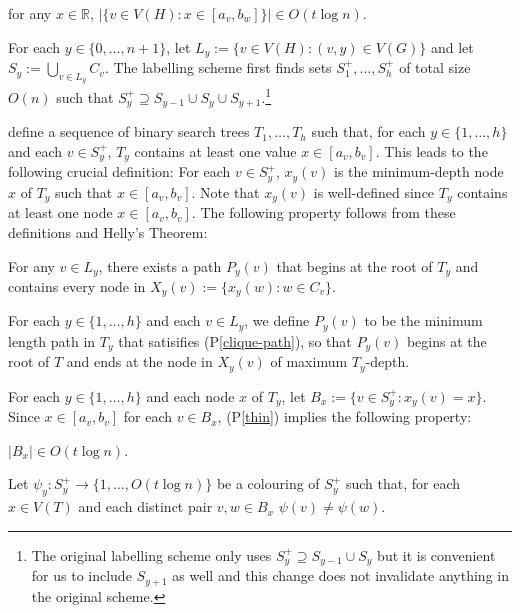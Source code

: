 \documentclass{patmorin}
\newcommand{\pref}[1]{(P\ref{#1})}
\newcommand{\R}{\mathbb{R}}
\begin{document}
\begin{compactenum}[(P1)]
    \item for any $x\in \R$, $|\{v\in V(H): x\in[a_v,b_w]\}|\in O(t\log n)$.\label{thin}
\end{compactenum}

For each $y\in\{0,\ldots,n+1\}$, let $L_y:=\{v\in V(H): (v,y)\in V(G)\}$ and let $S_y:=\bigcup_{v\in L_y}C_v$.  The labelling scheme first finds sets $S^+_1,\ldots,S^+_h$ of total size $O(n)$ such that $S^+_y\supseteq S_{y-1}\cup S_y\cup S_{y+1}$.\footnote{The original labelling scheme only uses $S^+_y\supseteq S_{y-1}\cup S_y$ but it is convenient for us to include $S_{y+1}$ as well and this change does not invalidate anything in the original scheme.}

\citet{dujmovic.esperet.ea:adjacency} define a sequence of binary search trees $T_1,\ldots,T_h$ such that, for each $y\in\{1,\ldots,h\}$ and each $v\in S^+_y$, $T_y$ contains at least one value $x\in [a_v,b_v]$.  This leads to the following crucial definition: For each $v\in S^+_y$, $x_{y}(v)$ is the minimum-depth node $x$ of $T_y$ such that $x\in [a_v,b_v]$. Note that $x_y(v)$ is well-defined since $T_y$ contains at least one node $x\in[a_v,b_v]$.   The following property follows from these definitions and Helly's Theorem:

\begin{compactenum}[(P1)]\setcounter{enumi}{1}
    \item For any $v\in L_y$, there exists a path $P_y(v)$ that begins at the root of $T_y$ and contains every node in $X_y(v):=\{x_{y}(w): w\in C_v\}$.\label{clique-path}
\end{compactenum}

For each $y\in\{1,\ldots,h\}$ and each $v\in L_y$, we define $P_y(v)$ to be the minimum length path in $T_y$ that satisifies \pref{clique-path}, so that $P_y(v)$ begins at the root of $T$ and ends at the node in $X_y(v)$ of maximum $T_y$-depth.

For each $y\in\{1,\ldots,h\}$ and each node $x$ of $T_y$, let $B_x:=\{v\in S^+_y: x_y(v)=x\}$.  Since $x\in[a_v,b_v]$ for each $v\in B_x$, \pref{thin} implies the following property:
\begin{compactenum}[(P1)]\setcounter{enumi}{2}
    \item $|B_x|\in O(t\log n)$. \label{small-bags-i}
\end{compactenum}
Let $\psi_y:S^+_y\to\{1,\ldots,O(t\log n)\}$ be a colouring of $S^+_y$ such that, for each $x\in V(T)$ and each distinct pair $v,w\in B_x$ $\psi(v)\neq\psi(w)$.
\end{document}
